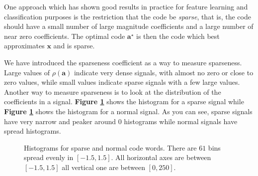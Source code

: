 \documentclass[12pt,a4paper,oneside,english]{UPBThesis}
\begin{document}
One approach which has shown good results in practice for feature learning \cite{emergence-sparse-coding,sparse-coding-strategy-V1} and classification purposes \cite{sparse-features-audio-classification,importance-encoding-sparse-coding-vq,simple-method-sparse-coding} is the restriction that the code be \emph{sparse}, that is, the code should have a small number of large magnitude coefficients and a large number of near zero coefficients. The optimal code $\textbf{a}^\star$ is then the code which best approximates $\textbf{x}$ and is sparse.

We have introduced the sparseness coefficient as a way to measure sparseness. Large values of $\rho(\textbf{a})$ indicate very dense signals, with almost no zero or close to zero values, while small values indicate sparse signals with a few large values. Another way to measure sparseness is to look at the distribution of the coefficients in a signal. \textbf{Figure \ref{fig:CodingMethodsCoeffHists}} shows the histogram for a sparse signal while \textbf{Figure \ref{fig:CodingMethodsCoeffHists}} shows the histogram for a normal signal. As you can see, sparse signals have very narrow and peaker around $0$ histograms while normal signals have spread histograms.

\begin{figure}
\centering
{}
\caption{Histograms for sparse and normal code words. There are $61$ bins spread evenly in $[-1.5,1.5]$. All horizontal axes are between $[-1.5,1.5]$ all vertical one are between $[0,250]$.}
\label{fig:CodingMethodsCoeffHists}
\end{figure}
\end{document}
